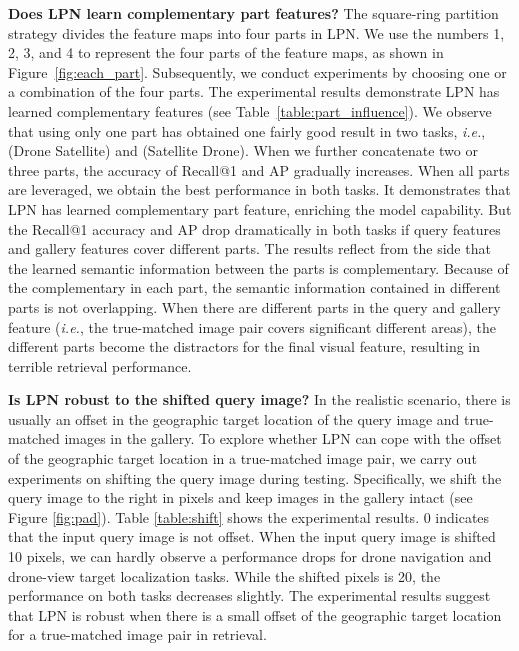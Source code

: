 \documentclass[journal]{IEEEtran}
\def\ie{\emph{i.e.}}
\begin{document}
\textbf{Does LPN learn complementary part features?}
The square-ring partition strategy divides the feature maps into four parts in LPN. We use the numbers 1, 2, 3, and 4 to represent the four parts of the feature maps, as shown in Figure~\ref{fig:each_part}. Subsequently, we conduct experiments by choosing one or a combination of the four parts. The experimental results demonstrate LPN has learned complementary features (see Table~\ref{table:part_influence}). We observe that using only one part has obtained one fairly good result in two tasks, \ie, (Drone  Satellite) and (Satellite  Drone). When we further concatenate two or three parts, the accuracy of Recall@1 and AP gradually increases. 
When all parts are leveraged, we obtain the best performance in both tasks. It demonstrates that LPN has learned complementary part feature, enriching the model capability. But the Recall@1 accuracy and AP drop dramatically in both tasks if query features and gallery features cover different parts. The results reflect from the side that the learned semantic information between the parts is complementary. Because of the complementary in each part, the semantic information contained in different parts is not overlapping. When there are different parts in the query and gallery feature (\ie, the true-matched image pair covers significant different areas), the different parts become the distractors for the final visual feature, resulting in terrible retrieval performance. 
\par
\textbf{Is LPN robust to the shifted query image?} In the realistic scenario, there is usually an offset in the geographic target location of the query image and true-matched images in the gallery. To explore whether LPN can cope with the offset of the geographic target location in a true-matched image pair, we carry out experiments on shifting the query image during testing. Specifically, we shift the query image to the right in pixels and keep images in the gallery intact (see Figure \ref{fig:pad}). Table \ref{table:shift} shows the experimental results. 0 indicates that the input query image is not offset. When the input query image is shifted 10 pixels, we can hardly observe a performance drops for drone navigation and drone-view target localization tasks. While the shifted pixels is 20, the performance on both tasks decreases slightly. The experimental results suggest that LPN is robust when there is a small offset of the geographic target location for a true-matched image pair in retrieval.
\end{document}
